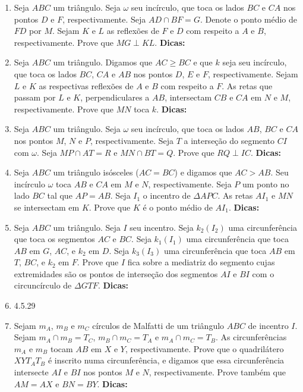 \documentclass{article}
\newcommand{\dica}{\textbf{Dicas:}}
\newcommand{\iniTri}{Seja $ABC$ um triângulo}
\begin{document}
\begin{multicols}{2}
\begin{enumerate}
    \item \iniTri. Seja $\omega$ seu incírculo, que toca os lados $BC$ e $CA$ nos pontos $D$ e $F$, respectivamente. Seja $AD\cap BF=G$. Denote o ponto médio de $FD$ por $M$. Sejam $K$ e $L$ as reflexões de $F$ e $D$ com respeito a $A$ e $B$, respectivamente. Prove que $MG\perp KL$. \dica %
    
    \item \iniTri. Digamos que $AC\geq BC$ e que $k$ seja seu incírculo, que toca os lados $BC$, $CA$ e $AB$ nos pontos $D$, $E$ e $F$, respectivamente. Sejam $L$ e $K$ as respectivas reflexões de $A$ e $B$ com respeito a $F$. As retas que passam por $L$ e $K$, perpendiculares a $AB$, intersectam $CB$ e $CA$ em $N$ e $M$, respectivamente. Prove que $MN$ toca $k$. \dica %
    
    \item \iniTri. Seja $\omega$ seu incírculo, que toca os lados $AB$, $BC$ e $CA$ nos pontos $M$, $N$ e $P$, respectivamente. Seja $T$ a interseção do segmento $CI$ com $\omega$. Seja $MP\cap AT=R$ e $MN\cap BT=Q$. Prove que $RQ\perp IC$. \dica %
    
    \item Seja $ABC$ um triângulo isósceles ($AC=BC$) e digamos que $AC>AB$. Seu incírculo $\omega$ toca $AB$ e $CA$ em $M$ e $N$, respectivamente. Seja $P$ um ponto no lado $BC$ tal que $AP=AB$. Seja $I_1$ o incentro de $\Delta APC$. As retas $AI_1$ e $MN$ se intersectam em $K$. Prove que $K$ é o ponto médio de $AI_1$. \dica %
    
    \item \iniTri. Seja $I$ seu incentro. Seja $k_2(I_2)$ uma circunferência que toca os segmentos $AC$ e $BC$. Seja $k_1(I_1)$ uma circunferência que toca $AB$ em $G$, $AC$, e $k_2$ em $D$. Seja $k_3(I_3)$ uma circunferência que toca $AB$ em $T$, $BC$, e $k_2$ em $F$. Prove que $I$ fica sobre a mediatriz do segmento cujas extremidades são os pontos de interseção dos segmentos $AI$ e $BI$ com o circuncírculo de $\Delta GTF$. \dica %
    
    \item 4.5.29
    
    \item Sejam $m_A$, $m_B$ e $m_C$ círculos de Malfatti de um triângulo $ABC$ de incentro $I$. Sejam $m_A\cap m_B=T_C$, $m_B\cap m_C=T_A$ e $m_A\cap m_C=T_B$. As circunferências $m_A$ e $m_B$ tocam $AB$ em $X$ e $Y$, respectivamente. Prove que o quadrilátero $XYT_AT_B$ é inscrito numa circunferência, e digamos que essa circunferência intersecte $AI$ e $BI$ nos pontos $M$ e $N$, respectivamente. Prove também que $AM=AX$ e $BN=BY$. \dica %
    

\end{enumerate}
\end{multicols}
\end{document}

